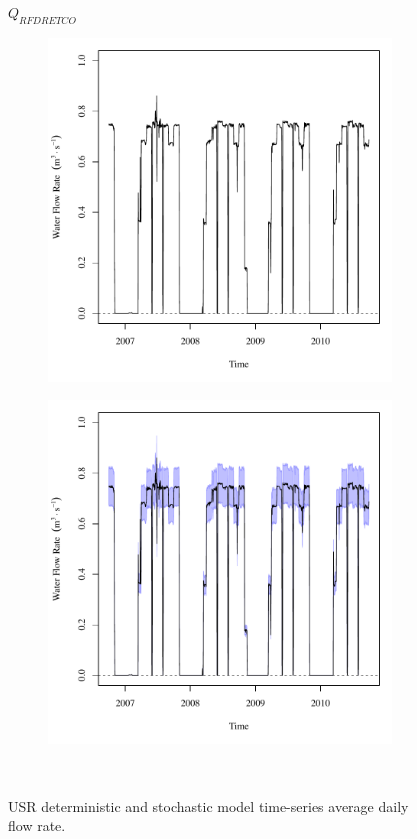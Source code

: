 \subfiguremid
\begin{landscape}
	\begin{figure}
		\centering
		$ Q_{RFDRETCO} $
		\begin{subfigure}{0.7\textwidth}
			\centering
			\includegraphics[width=\tableCustomSize]{"Figures/Results_USR/Deterministic/Q RFR"}
		\end{subfigure}%
		\begin{subfigure}{0.7\textwidth}
			\centering
			\includegraphics[width=\tableCustomSize]{"Figures/Results_USR/Stochastic/Q RFR"}
		\end{subfigure}\\
		\caption{USR deterministic and stochastic model time-series average daily flow rate.}
	\end{figure}
\end{landscape}
